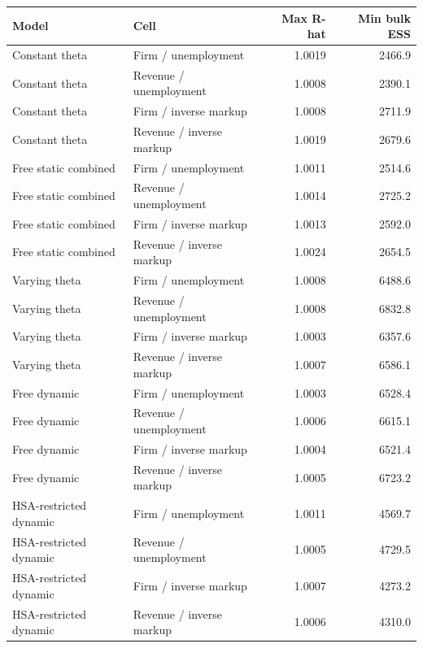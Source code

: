 \begin{tabular}{@{}llrr@{}}
\toprule
Model & Cell & Max R-hat & Min bulk ESS \\
\midrule
Constant theta & Firm / unemployment & 1.0019 & 2466.9 \\
Constant theta & Revenue / unemployment & 1.0008 & 2390.1 \\
Constant theta & Firm / inverse markup & 1.0008 & 2711.9 \\
Constant theta & Revenue / inverse markup & 1.0019 & 2679.6 \\
Free static combined & Firm / unemployment & 1.0011 & 2514.6 \\
Free static combined & Revenue / unemployment & 1.0014 & 2725.2 \\
Free static combined & Firm / inverse markup & 1.0013 & 2592.0 \\
Free static combined & Revenue / inverse markup & 1.0024 & 2654.5 \\
Varying theta & Firm / unemployment & 1.0008 & 6488.6 \\
Varying theta & Revenue / unemployment & 1.0008 & 6832.8 \\
Varying theta & Firm / inverse markup & 1.0003 & 6357.6 \\
Varying theta & Revenue / inverse markup & 1.0007 & 6586.1 \\
Free dynamic & Firm / unemployment & 1.0003 & 6528.4 \\
Free dynamic & Revenue / unemployment & 1.0006 & 6615.1 \\
Free dynamic & Firm / inverse markup & 1.0004 & 6521.4 \\
Free dynamic & Revenue / inverse markup & 1.0005 & 6723.2 \\
HSA-restricted dynamic & Firm / unemployment & 1.0011 & 4569.7 \\
HSA-restricted dynamic & Revenue / unemployment & 1.0005 & 4729.5 \\
HSA-restricted dynamic & Firm / inverse markup & 1.0007 & 4273.2 \\
HSA-restricted dynamic & Revenue / inverse markup & 1.0006 & 4310.0 \\
\bottomrule
\end{tabular}
